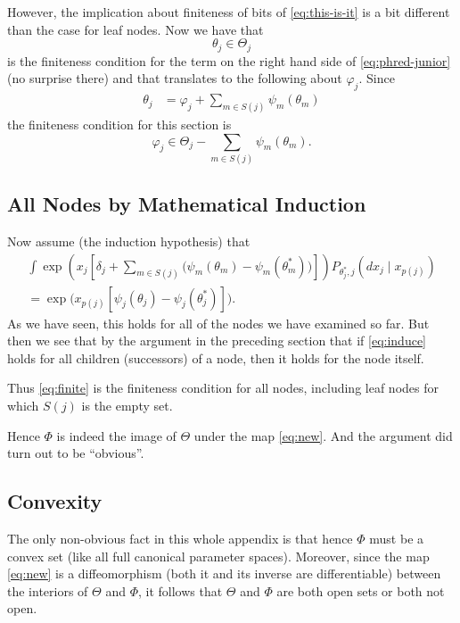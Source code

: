 However, the implication about finiteness of bits of \eqref{eq:this-is-it}
is a bit different than the case for leaf nodes.  Now we have that
$$
   \theta_j \in \Theta_j
$$
is the finiteness condition for the term on the right hand side of
\eqref{eq:phred-junior} (no surprise there) and that translates to
the following about $\varphi_j$.  Since
\begin{align*}
   \theta_j
   & =
   \varphi_j + \sum_{m \in S(j)} \psi_m(\theta_m)
\end{align*}
the finiteness condition for this section is
\begin{equation} \label{eq:finite}
   \varphi_j \in \Theta_j - \sum_{m \in S(j)} \psi_m(\theta_m).
\end{equation}

\subsection{All Nodes by Mathematical Induction}

Now assume (the induction hypothesis) that
\begin{multline}
   \label{eq:induce}
   \int \exp\left( x_j \left[ \delta_j + \sum_{m \in S(j)}
     \bigl( \psi_m(\theta_m) - \psi_m(\theta_m^*) \bigr) \right] \right)
   P_{\theta_j^*, j}(d x_j \mid x_{p(j)})
   \\
   =
   \exp\bigl( x_{p(j)}
   [ \psi_j(\theta_j) - \psi_j(\theta_j^*) ] \bigr).
\end{multline}
As we have seen, this holds for all of the nodes we have examined so far.
But then we see that by the argument in the preceding section that if
\eqref{eq:induce} holds for all children (successors) of a node, then it
holds for the node itself.

Thus \eqref{eq:finite} is the finiteness condition for all nodes,
including leaf nodes for which $S(j)$ is the empty set.

Hence $\Phi$ is indeed the image of $\Theta$ under the map \eqref{eq:new}.
And the argument did turn out to be ``obvious''.

\subsection{Convexity}

The only non-obvious fact in this whole appendix is that hence $\Phi$ must
be a convex set (like all full canonical parameter spaces).  Moreover,
since the map \eqref{eq:new} is a diffeomorphism (both it and its inverse
are differentiable) between the interiors of $\Theta$ and $\Phi$, it follows
that $\Theta$ and $\Phi$ are both open sets or both not open.

